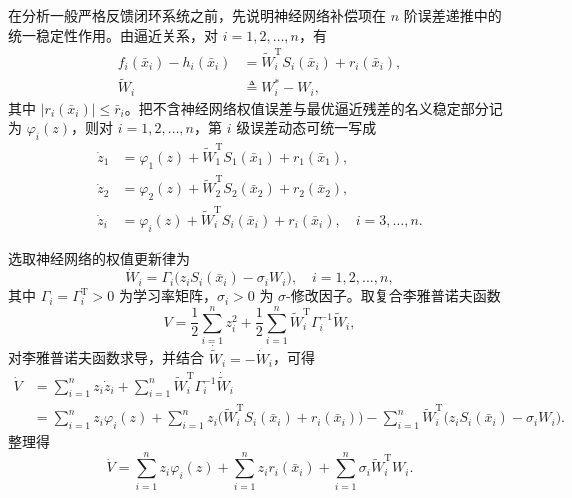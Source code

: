 在分析一般严格反馈闭环系统之前，先说明神经网络补偿项在 $n$ 阶误差递推中的统一稳定性作用。由逼近关系，对 $i=1,2,\ldots,n$，有
\begin{subequations}\label{eq:ch2_nn_core_approx}
\begin{align}
  f_i(\bar x_i)-h_i(\bar x_i)&=\tilde W_i^{\mathrm T}S_i(\bar x_i)+r_i(\bar x_i),\label{eq:ch2_nn_core_approxa}\\
  \tilde W_i&\triangleq W_i^\ast-W_i,\label{eq:ch2_nn_core_approxb}
\end{align}
\end{subequations}
其中 $|r_i(\bar x_i)|\le \bar r_i$。把不含神经网络权值误差与最优逼近残差的名义稳定部分记为 $\varphi_i(z)$，则对 $i=1,2,\ldots,n$，第 $i$ 级误差动态可统一写成
\begin{subequations}\label{eq:ch2_nn_core_sys}
\begin{align}
  \dot z_1&=\varphi_1(z)+\tilde W_1^{\mathrm T}S_1(\bar x_1)+r_1(\bar x_1),\label{eq:ch2_nn_core_sysa}\\
  \dot z_2&=\varphi_2(z)+\tilde W_2^{\mathrm T}S_2(\bar x_2)+r_2(\bar x_2),\label{eq:ch2_nn_core_sysb}\\
  \dot z_i&=\varphi_i(z)+\tilde W_i^{\mathrm T}S_i(\bar x_i)+r_i(\bar x_i),\quad i=3,\ldots,n.\label{eq:ch2_nn_core_sysc}
\end{align}
\end{subequations}

选取神经网络的权值更新律为
\begin{equation}\label{eq:ch2_nn_core_update}
  \dot W_i=\Gamma_i\big(z_iS_i(\bar x_i)-\sigma_iW_i\big),\quad i=1,2,\ldots,n,
\end{equation}
其中 $\Gamma_i=\Gamma_i^{\mathrm T}>0$ 为学习率矩阵，$\sigma_i>0$ 为 $\sigma$-修改因子。取复合李雅普诺夫函数
\begin{equation}\label{eq:ch2_nn_core_V}
  V=\frac{1}{2}\sum_{i=1}^{n}z_i^2+\frac{1}{2}\sum_{i=1}^{n}\tilde W_i^{\mathrm T}\Gamma_i^{-1}\tilde W_i,
\end{equation}
对李雅普诺夫函数求导，并结合 $\dot{\tilde W}_i=-\dot W_i$，可得
\begin{equation}\label{eq:ch2_nn_core_Vdot1}
\begin{aligned}
  \dot V
  &=\sum_{i=1}^{n}z_i\dot z_i+\sum_{i=1}^{n}\tilde W_i^{\mathrm T}\Gamma_i^{-1}\dot{\tilde W}_i\\
  &=\sum_{i=1}^{n}z_i\varphi_i(z)+\sum_{i=1}^{n}z_i\big(\tilde W_i^{\mathrm T}S_i(\bar x_i)+r_i(\bar x_i)\big)
    -\sum_{i=1}^{n}\tilde W_i^{\mathrm T}\big(z_iS_i(\bar x_i)-\sigma_iW_i\big).
\end{aligned}
\end{equation}
整理得
\begin{equation}\label{eq:ch2_nn_core_Vdot2}
  \dot V
  =\sum_{i=1}^{n}z_i\varphi_i(z)+\sum_{i=1}^{n}z_ir_i(\bar x_i)
  +\sum_{i=1}^{n}\sigma_i\tilde W_i^{\mathrm T}W_i.
\end{equation}

